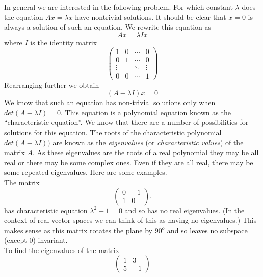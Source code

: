 \documentclass{amsart}
\begin{document}
In general we are interested in the following problem. For which constant $\lambda$ does the equation $Ax=\lambda x$ have nontrivial solutions. It should be clear that $x=0$ is always a solution of such an equation. We rewrite this equation as\\
\begin{equation*}
Ax=\lambda Ix
\end{equation*}
where $I$ is the identity matrix\\
\begin{equation*}
 \begin{pmatrix}
 1&0&\cdots& 0\\
 0&1&\cdots& 0\\
 \vdots&&\ddots&\vdots\\
 0&0&\cdots& 1
 \end{pmatrix}
\end{equation*}
Rearranging further we obtain\\
\begin{equation*}
(A-\lambda I)x=0
\end{equation*}
We know that such an equation has non-trivial solutions only when $det(A-\lambda I)=0$. This equation is a polynomial equation known as the ``characteristic equation''. We know that there are a number of possibilities for solutions for this equation. The roots of the characteristic polynomial $det(A-\lambda I))$ are known as the {\it eigenvalues} (or {\it characteristic values}) of the matrix $A$. As these eigenvalues are the roots of a real polynomial they may be all real or there may be some complex ones. Even if they are all real, there may be some repeated eigenvalues. Here are some examples.\\
 The matrix 
 \begin{equation*}
 \begin{pmatrix}
 0&-1\\
 1&0
 \end{pmatrix}.
\end{equation*}
has characteristic equation $\lambda^{2}+1=0$ and so has no real eigenvalues. (In the context of real vector spaces we can think of this as having no eigenvalues.) This makes sense as this matrix rotates the plane by $90^{o}$ and so leaves no subspace (except $0$) invariant.\\
To find the eigenvalues of the matrix 
\begin{equation*}
 \begin{pmatrix}
1&3\\
 5&-1
 \end{pmatrix}
\end{equation*}
\end{document}
